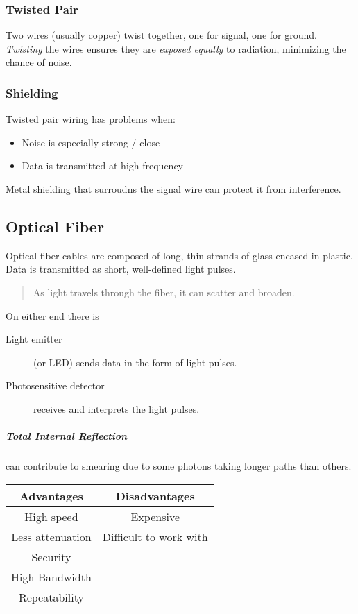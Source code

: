 \documentclass{article}
\begin{document}
\subsubsection*{Twisted Pair}
Two wires (usually copper) twist together, one for signal, one for ground.
\emph{Twisting} the wires ensures they are \emph{exposed equally} to radiation,
minimizing the chance of noise.


\subsubsection*{Shielding}
Twisted pair wiring has problems when:
\begin{itemize}
    \item Noise is especially strong / close
    \item Data is transmitted at high frequency
\end{itemize}

Metal shielding that surroudns the signal wire can protect it from interference.

\subsection*{Optical Fiber}
Optical fiber cables are composed of long, thin strands of glass encased in
plastic.
Data is transmitted as short, well-defined light pulses.

\begin{quote}
    As light travels through the fiber, it can scatter and broaden.
\end{quote}

On either end there is
\begin{description}
    \item[Light emitter]  (or LED) sends data in the form of light pulses.
    \item[Photosensitive detector] receives and interprets the light pulses.
\end{description}

\subparagraph*{Total Internal Reflection} can contribute to smearing due to some
photons taking longer paths than others.

\begin{tabular}{c|c}
    Advantages       & Disadvantages          \\ \hline
    High speed       & Expensive              \\
    Less attenuation & Difficult to work with \\
    Security         &                        \\
    High Bandwidth   &                        \\
    Repeatability
\end{tabular}
\end{document}
